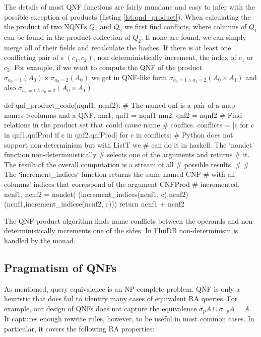 The details of most QNF functions are fairly mundane and easy to infer
with the possible exception of products (listing
\ref{lst:qnd_product}). When calculating the the product of two NQNFs
\(Q_1\) and \(Q_2\) we first find conflicts, where columns of \(Q_1\)
can be found in the product collection of \(Q_2\). If none are found,
we can simply merge all of their fields and recalculate the hashes.
If there is at least one conflicting pair of s
\((c_1,c_2)\), non deterministically increment, the index of \(c_1\) or
\(c_2\). For example, if we want to compute the QNF of the product
\(\sigma_{a_0=1}(A_0) \times \sigma_{a_0=2}(A_0)\) we get in QNF-like
form \(\sigma_{a_0=1 \land a_1=2} (A_0 \times A_1)\) and also
\(\sigma_{a_1=1 \land a_0=2} (A_0 \times A_1)\).

\begin{code}
  \begin{pycode}
    def qnf_product_code(nqnf1, nqnf2):
        # The named qnf is a pair of a map names->columns and a QNF.
        nm1, qnf1 = nqnf1
        nm2, qnf2 = nqnf2
        # Find relations in the product set that could cause name
        # conflics.
        conflicts = [c for c in qnf1.qnfProd if c in qnf2.qnfProd]
        for c in conflicts:
            # Python does not support non-determinism but with ListT we
            # can do it in haskell. The `nondet' function non-deterministically 
            # selects one of the arguments and returns
            # it. The result of the overall computation is a stream of all
            # possible results.
            #
            # The `increment_indices` function returns the same named CNF
            # with all columns' indices that correspond of the argument CNFProd
            # incremented.
            ncnf1, ncnf2 = nondet(
                (increment_indices(ncnf1, c),ncnf2)
                (ncnf1,increment_indicse(ncnf2, c)))
        return ncnf1 + ncnf2
\end{pycode}
  \caption{\label{lst:qnf_product}The QNF product algorithm finds name conflicts between the
    operands and non-deterministically increments one of the sides. In FluiDB non-determinism
    is handled by the  monad.}
\end{code}

\subsection{Pragmatism of QNFs}

As mentioned, query equivalence is an NP-complete problem. QNF is only
a heuristic that does fail to identify many cases of equivalent RA
queries.  For example, our design of QNFs does not capture the
equivalence \(\sigma_p A \cup \sigma_{\neg p} A = A\). It captures
enough rewrite rules, however, to be useful in most common cases. In
particular, it covers the following RA properties:

